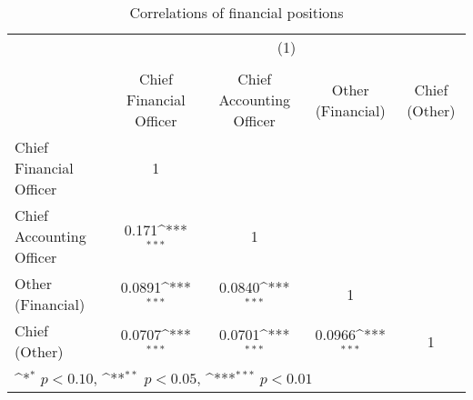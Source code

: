 \begin{table}[htbp]\centering
\def\sym#1{\ifmmode^{#1}\else\(^{#1}\)\fi}
\caption{Correlations of financial positions}
\begin{tabular}{l*{4}{c}}
\toprule
                &\multicolumn{4}{c}{(1)}                                                    \\
                &\multicolumn{4}{c}{}                                                       \\
                &Chief Financial Officer         &Chief Accounting Officer         &Other (Financial)         &Chief (Other)         \\
\midrule
Chief Financial Officer&        1         &                  &                  &                  \\
Chief Accounting Officer&    0.171\sym{***}&        1         &                  &                  \\
Other (Financial)&   0.0891\sym{***}&   0.0840\sym{***}&        1         &                  \\
Chief (Other)   &   0.0707\sym{***}&   0.0701\sym{***}&   0.0966\sym{***}&        1         \\
\bottomrule
\multicolumn{5}{l}{\footnotesize \sym{*} \(p<0.10\), \sym{**} \(p<0.05\), \sym{***} \(p<0.01\)}\\
\end{tabular}
\end{table}
